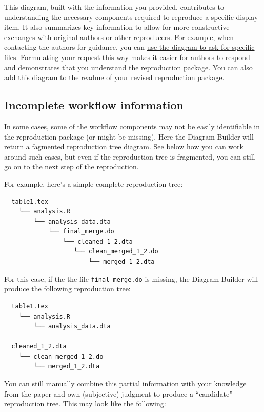 \documentclass[
  openany]{book}
\begin{document}
This diagram, built with the information you provided, contributes to understanding the necessary components required to reproduce a specific display item. It also summarizes key information to allow for more constructive exchanges with original authors or other reproducers. For example, when contacting the authors for guidance, you can \protect\hyperlink{ask-missing-mat}{use the diagram to ask for specific files}. Formulating your request this way makes it easier for authors to respond and demonstrates that you understand the reproduction package. You can also add this diagram to the readme of your revised reproduction package.

\hypertarget{incomplete-workflow-information}{%
\subsection{Incomplete workflow information}\label{incomplete-workflow-information}}

In some cases, some of the workflow components may not be easily identifiable in the reproduction package (or might be missing). Here the Diagram Builder will return a fagmented reproduction tree diagram. See below how you can work around such cases, but even if the reproduction tree is fragmented, you can still go on to the next step of the reproduction.

For example, here's a simple complete reproduction tree:

\begin{verbatim}
  table1.tex
    └── analysis.R
        └── analysis_data.dta
            └── final_merge.do
                └── cleaned_1_2.dta
                   └── clean_merged_1_2.do
                       └── merged_1_2.dta
\end{verbatim}

For this case, if the the file \texttt{final\_merge.do} is missing, the Diagram Builder will produce the following reproduction tree:

\begin{verbatim}
  table1.tex
    └── analysis.R
        └── analysis_data.dta

  cleaned_1_2.dta
    └── clean_merged_1_2.do
        └── merged_1_2.dta
\end{verbatim}

You can still manually combine this partial information with your knowledge from the paper and own (subjective) judgment to produce a ``candidate'' reproduction tree. This may look like the following:
\end{document}
